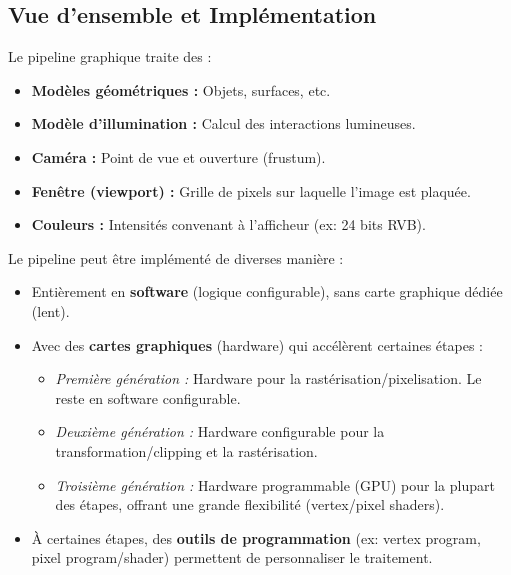 \documentclass{article}
\begin{document}
\subsection{Vue d'ensemble et Implémentation}
Le pipeline graphique traite des :
\begin{itemize}
    \item \textbf{Modèles géométriques :} Objets, surfaces, etc.
    \item \textbf{Modèle d'illumination :} Calcul des interactions lumineuses.
    \item \textbf{Caméra :} Point de vue et ouverture (frustum).
    \item \textbf{Fenêtre (viewport) :} Grille de pixels sur laquelle l'image est plaquée.
    \item \textbf{Couleurs :} Intensités convenant à l'afficheur (ex: 24 bits RVB).
\end{itemize}
Le pipeline peut être implémenté de diverses manière :
\begin{itemize}
    \item Entièrement en \textbf{software} (logique configurable), sans carte graphique dédiée (lent).
    \item Avec des \textbf{cartes graphiques} (hardware) qui accélèrent certaines étapes :
    \begin{itemize}
        \item \textit{Première génération :} Hardware pour la rastérisation/pixelisation. Le reste en software configurable.
        \item \textit{Deuxième génération :} Hardware configurable pour la transformation/clipping et la rastérisation.
        \item \textit{Troisième génération :} Hardware programmable (GPU) pour la plupart des étapes, offrant une grande flexibilité (vertex/pixel shaders).
    \end{itemize}
    \item À certaines étapes, des \textbf{outils de programmation} (ex: vertex program, pixel program/shader) permettent de personnaliser le traitement.
\end{itemize}
\end{document}
